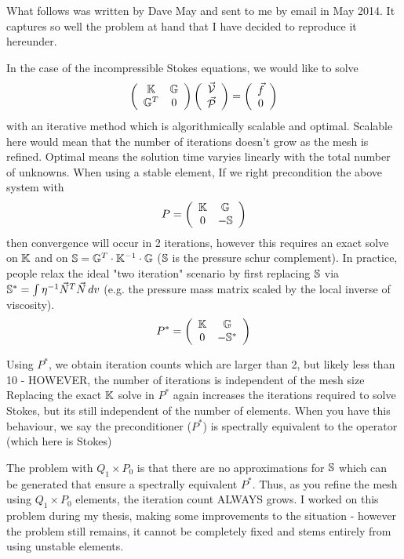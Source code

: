 What follows was written by Dave May and sent to me by email in May 2014. 
It captures so well the problem at hand that I have decided to reproduce it hereunder.

\hspace{4mm}

In the case of the incompressible Stokes equations, we would like to solve
\[
\left(
\begin{array}{cc}
{\mathbb{K}}   & {\mathbb{G}}\\
{\mathbb{G}}^T & 0
\end{array}
\right)
\left(
\begin{array}{c}
\vec{\cal V}\\
\vec{\cal P}
\end{array}
\right)
= 
\left(
\begin{array}{c}
\vec f \\0
\end{array}
\right)
\]
with an iterative method which is algorithmically scalable and optimal. 
Scalable here would mean
that the number of iterations doesn't grow as the mesh is refined. Optimal means the solution 
time varyies linearly with the total number of unknowns. 
When using a stable element,
If we right precondition the above system with
\[
P=
\left(
\begin{array}{cc}
{\mathbb{K}}   & {\mathbb{G}}\\
0   & -{\mathbb{S}}
\end{array}
\right)
\]
then convergence will occur in 2 iterations,
however this requires an exact solve on ${\mathbb{K}}$ 
and on ${\mathbb{S}} = {\mathbb{G}}^T\cdot {\mathbb{K}}^{-1}\cdot {\mathbb{G}}$ (${\mathbb{S}}$ is the pressure schur complement).
In practice, people relax the ideal "two iteration" scenario by first replacing
${\mathbb{S}}$ via 
${\mathbb{S}}^* = \int \eta^{-1} \vec N^T \vec N \, dv$ 
(e.g. the pressure mass matrix scaled by the local inverse of viscosity).
\[
P^*=
\left(
\begin{array}{cc}
{\mathbb{K}}   & {\mathbb{G}}\\
0   & -{\mathbb{S}}^*
\end{array}
\right)
\]

Using $P^*$, we obtain iteration counts which are larger than 2, but likely
less than 10 - HOWEVER, the number of iterations is independent of the mesh size
Replacing the exact ${\mathbb{K}}$ solve in $P^*$ again increases the iterations required to solve Stokes,
but its still independent of the number of elements. When you have this behaviour,
we say the preconditioner ($P^*$) is spectrally equivalent to the operator (which here is Stokes)

The problem with $Q_1\times P_0$ is that there are no approximations for
${\mathbb{S}}$ which can be generated that ensure a spectrally equivalent $P^*$. Thus, as you refine
the mesh using $Q_1 \times P_0$ elements, the iteration count ALWAYS grows. I worked on this problem
during my thesis, making some improvements to the situation - however the problem still remains,
it cannot be completely fixed and stems entirely from using unstable elements.

